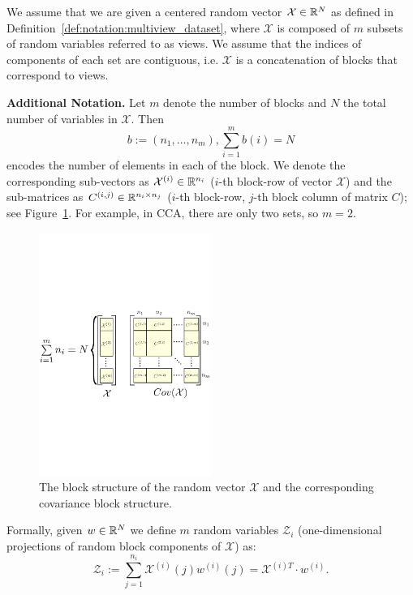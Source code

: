 We assume that we are given a centered random vector $\mathcal{X} \in \mathbb{R}^N$ as defined in Definition~\ref{def:notation:multiview_dataset},
where $\mathcal{X}$ is composed of $m$ subsets of random variables referred to as views. We assume that the indices of components
of each set are contiguous, i.e. $\mathcal{X}$ is a concatenation of blocks that correspond to views.

\noindent\textbf{Additional Notation.}
Let $m$ denote the number of blocks and $N$ the total number of
variables in $\mathcal{X}$. Then
$$b := \left(n_1, \ldots, n_m\right), \sum_{i=1}^m b\left(i\right) = N$$
encodes the number of elements in each of the block. We denote the corresponding
sub-vectors as $\mathcal{X}^{(i)} \in \mathbb{R}^{n_i}$
($i$-th block-row of vector $\mathcal{X}$) and the sub-matrices as $C^{(i,j)} \in \mathbb{R}^{n_i \times n_j}$
($i$-th block-row, $j$-th block column of matrix $C$); see Figure~\ref{fig:block_structure}.
For example, in CCA, there are only two sets, so $m=2$.
\begin{figure}[t]
\centering
\includegraphics[width=0.5\textwidth]{figures/block_structure.pdf}
\caption[The block structure]{The block structure of the  random vector $\mathcal{X}$ and the corresponding covariance block structure.}
\label{fig:block_structure}
\end{figure}

Formally, given $w \in \mathbb{R}^N$ we define $m$ random variables $\mathcal{Z}_i$ (one-dimensional
projections of random block components of $\mathcal{X}$) as:
\begin{equation*}
\mathcal{Z}_i := \sum_{j = 1}^{n_i} \mathcal{X}^{(i)}\left(j\right)
w^{(i)}\left(j\right) = \mathcal{X}^{(i)T} \cdot w^{(i)}.
\end{equation*}

